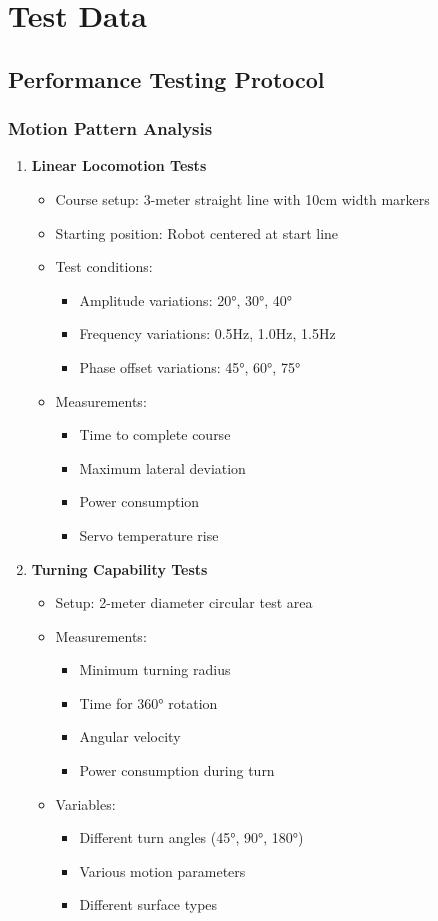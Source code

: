 \documentclass[12pt,a4paper]{report}
\begin{document}
\chapter{Test Data}
\section{Performance Testing Protocol}
\subsection{Motion Pattern Analysis}
\begin{enumerate}
\item \textbf{Linear Locomotion Tests}
\begin{itemize}
\item Course setup: 3-meter straight line with 10cm width markers
\item Starting position: Robot centered at start line
\item Test conditions:
\begin{itemize}
\item Amplitude variations: 20°, 30°, 40°
\item Frequency variations: 0.5Hz, 1.0Hz, 1.5Hz
\item Phase offset variations: 45°, 60°, 75°
\end{itemize}
\item Measurements:
\begin{itemize}
\item Time to complete course
\item Maximum lateral deviation
\item Power consumption
\item Servo temperature rise
\end{itemize}
\end{itemize}
\item \textbf{Turning Capability Tests}
\begin{itemize}
    \item Setup: 2-meter diameter circular test area
    \item Measurements:
    \begin{itemize}
        \item Minimum turning radius
        \item Time for 360° rotation
        \item Angular velocity
        \item Power consumption during turn
    \end{itemize}
    \item Variables:
    \begin{itemize}
        \item Different turn angles (45°, 90°, 180°)
        \item Various motion parameters
        \item Different surface types
    \end{itemize}
\end{itemize}
\end{enumerate}
\end{document}
